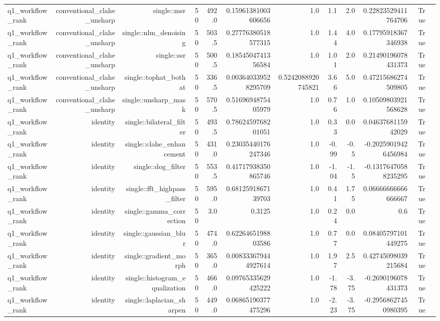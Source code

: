 \begin{tabular}{lrrrrrrrrrrr}
q1\_workflow\_rank & conventional\_clahe\_unsharp & single::msr & 50 & 492.0 & 0.15961381003606656 & 1.0 & 1.1 & 2.0 & 0.22823529411764706 & True &  \\
q1\_workflow\_rank & conventional\_clahe\_unsharp & single::nlm\_denoising & 50 & 503.5 & 0.27776380518577315 & 1.0 & 1.44 & 4.0 & 0.17795918367346938 & True &  \\
q1\_workflow\_rank & conventional\_clahe\_unsharp & single::ssr & 50 & 500.5 & 0.1854504741356584 & 1.0 & 1.01 & 2.0 & 0.21490196078431373 & True &  \\
q1\_workflow\_rank & conventional\_clahe\_unsharp & single::tophat\_bothat & 50 & 336.5 & 0.003640339528295709 & 0.5242088920745821 & 3.66 & 5.0 & 0.47215686274509805 & True &  \\
q1\_workflow\_rank & conventional\_clahe\_unsharp & single::unsharp\_mask & 50 & 570.5 & 0.5169694875405979 & 1.0 & 0.76 & 1.0 & 0.10509803921568628 & True &  \\
q1\_workflow\_rank & identity & single::bilateral\_filter & 50 & 493.5 & 0.7862459768201051 & 1.0 & 0.33 & 0.0 & 0.0463768115942029 & True &  \\
q1\_workflow\_rank & identity & single::clahe\_enhancement & 50 & 431.0 & 0.23035440176247346 & 1.0 & -0.99 & -0.5 & -0.20259019426456984 & True &  \\
q1\_workflow\_rank & identity & single::dog\_filter & 50 & 553.5 & 0.41717938350865746 & 1.0 & -1.04 & -1.5 & -0.13176470588235295 & True &  \\
q1\_workflow\_rank & identity & single::fft\_highpass\_filter & 50 & 595.0 & 0.6812591867139703 & 1.0 & 0.41 & 1.75 & 0.06666666666666667 & True &  \\
q1\_workflow\_rank & identity & single::gamma\_correction & 50 & 3.0 & 0.3125 & 1.0 & 0.24 & 0.0 & 0.6 & True &  \\
q1\_workflow\_rank & identity & single::gaussian\_blur & 50 & 474.0 & 0.6226465198803586 & 1.0 & 0.77 & 0.0 & 0.08405797101449275 & True &  \\
q1\_workflow\_rank & identity & single::gradient\_morph & 50 & 365.0 & 0.008333679444927614 & 1.0 & 1.97 & 2.5 & 0.42745098039215684 & True &  \\
q1\_workflow\_rank & identity & single::histogram\_equalization & 50 & 466.0 & 0.09765335629425222 & 1.0 & -1.78 & -3.75 & -0.2690196078431373 & True &  \\
q1\_workflow\_rank & identity & single::laplacian\_sharpen & 50 & 449.0 & 0.06865190377475296 & 1.0 & -2.23 & -3.75 & -0.29568627450980395 & True &  \\

\end{tabular}
